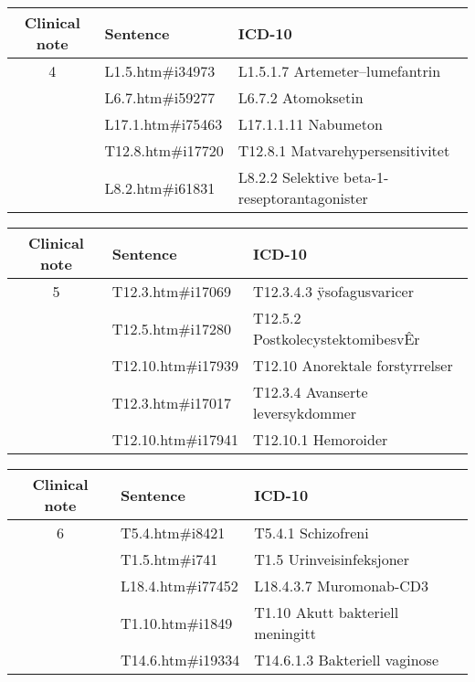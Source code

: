 \begin{table}[htbp]\footnotesize\center
\begin{tabular}{cll}
\toprule
Clinical note & Sentence & ICD-10 \\
\midrule
4 & L1.5.htm\#i34973   & L1.5.1.7 Artemeter–lumefantrin \\
  & L6.7.htm\#i59277   & L6.7.2 Atomoksetin \\
  & L17.1.htm\#i75463  & L17.1.1.11 Nabumeton \\
  & T12.8.htm\#i17720  & T12.8.1 Matvarehypersensitivitet \\
  & L8.2.htm\#i61831   & L8.2.2  Selektive beta-1-reseptorantagonister \\
\bottomrule
\end{tabular}
\end{table}

\begin{table}[htbp]\footnotesize\center
\begin{tabular}{cll}
\toprule
Clinical note & Sentence & ICD-10 \\
\midrule
5 & T12.3.htm\#i17069  & T12.3.4.3 ÿsofagusvaricer \\
  & T12.5.htm\#i17280  & T12.5.2 PostkolecystektomibesvÊr \\
  & T12.10.htm\#i17939 & T12.10 Anorektale forstyrrelser \\
  & T12.3.htm\#i17017  & T12.3.4 Avanserte leversykdommer \\
  & T12.10.htm\#i17941 & T12.10.1 Hemoroider \\
\bottomrule
\end{tabular}
\end{table}

\begin{table}[htbp]\footnotesize\center
\begin{tabular}{cll}
\toprule
Clinical note & Sentence & ICD-10 \\
\midrule
6 & T5.4.htm\#i8421    & T5.4.1 Schizofreni \\
  & T1.5.htm\#i741     & T1.5 Urinveisinfeksjoner \\
  & L18.4.htm\#i77452  & L18.4.3.7 Muromonab-CD3 \\
  & T1.10.htm\#i1849   & T1.10 Akutt bakteriell meningitt \\
  & T14.6.htm\#i19334  & T14.6.1.3 Bakteriell vaginose \\
\bottomrule
\end{tabular}
\end{table}

